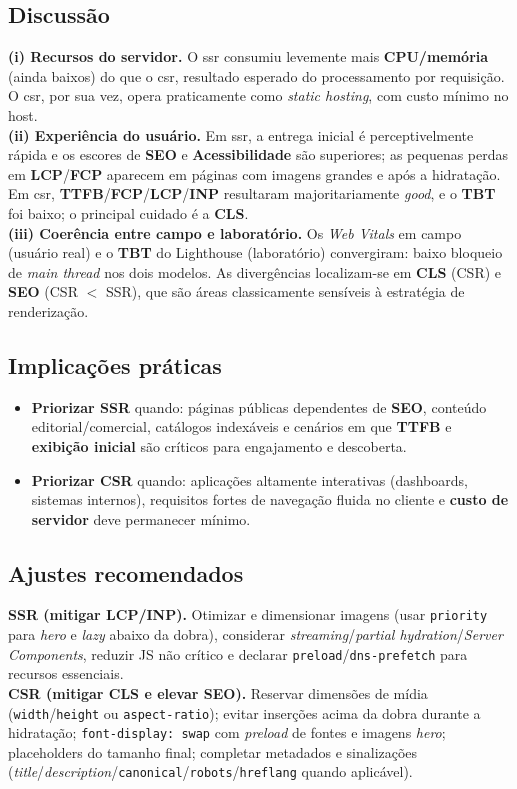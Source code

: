 \subsection{Discussão}
\label{subsec:discussao-comparativa}
\textbf{(i) Recursos do servidor.} O \acrshort{ssr} consumiu levemente mais \textbf{CPU/memória} (ainda baixos) do que o \acrshort{csr}, resultado esperado do processamento por requisição. O \acrshort{csr}, por sua vez, opera praticamente como \emph{static hosting}, com custo mínimo no host. \\
\textbf{(ii) Experiência do usuário.} Em \acrshort{ssr}, a entrega inicial é perceptivelmente rápida e os escores de \textbf{SEO} e \textbf{Acessibilidade} são superiores; as pequenas perdas em \textbf{LCP}/\textbf{FCP} aparecem em páginas com imagens grandes e após a hidratação. Em \acrshort{csr}, \textbf{TTFB}/\textbf{FCP}/\textbf{LCP}/\textbf{INP} resultaram majoritariamente \textit{good}, e o \textbf{TBT} foi baixo; o principal cuidado é a \textbf{CLS}. \\
\textbf{(iii) Coerência entre campo e laboratório.} Os \textit{Web Vitals} em campo (usuário real) e o \textbf{TBT} do Lighthouse (laboratório) convergiram: baixo bloqueio de \emph{main thread} nos dois modelos. As divergências localizam-se em \textbf{CLS} (CSR) e \textbf{SEO} (CSR $<$ SSR), que são áreas classicamente sensíveis à estratégia de renderização.

\subsection{Implicações práticas}
\begin{itemize}
  \item \textbf{Priorizar SSR} quando: páginas públicas dependentes de \textbf{SEO}, conteúdo editorial/comercial, catálogos indexáveis e cenários em que \textbf{TTFB} e \textbf{exibição inicial} são críticos para engajamento e descoberta.
  \item \textbf{Priorizar CSR} quando: aplicações altamente interativas (dashboards, sistemas internos), requisitos fortes de navegação fluida no cliente e \textbf{custo de servidor} deve permanecer mínimo.
\end{itemize}

\subsection{Ajustes recomendados}
\textbf{SSR (mitigar LCP/INP).} Otimizar e dimensionar imagens (usar \texttt{priority} para \emph{hero} e \emph{lazy} abaixo da dobra), considerar \emph{streaming}/\emph{partial hydration}/\emph{Server Components}, reduzir JS não crítico e declarar \texttt{preload}/\texttt{dns-prefetch} para recursos essenciais. \\
\textbf{CSR (mitigar CLS e elevar SEO).} Reservar dimensões de mídia (\texttt{width}/\texttt{height} ou \texttt{aspect-ratio}); evitar inserções acima da dobra durante a hidratação; \texttt{font-display: swap} com \emph{preload} de fontes e imagens \emph{hero}; placeholders do tamanho final; completar metadados e sinalizações (\emph{title}/\emph{description}/\texttt{canonical}/\texttt{robots}/\texttt{hreflang} quando aplicável).

